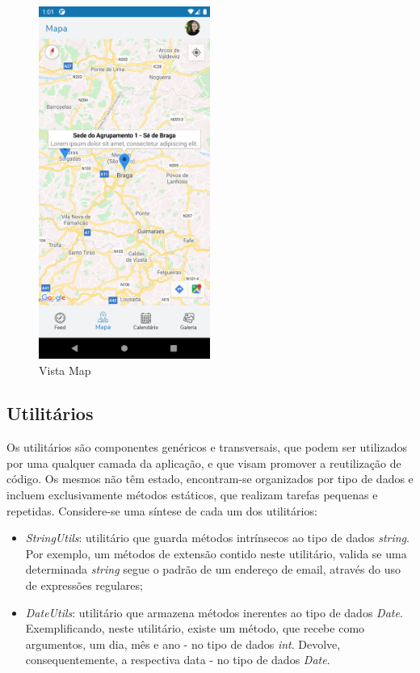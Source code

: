 \documentclass[12pt]{report}
\begin{document}
\begin{itemize}
    \bigskip
    \begin{figure}[H]
        \centering
        \includegraphics[width=0.5\textwidth]{view-map.png}
        \caption{Vista Map}
    \end{figure}

\end{itemize}

\clearpage

\subsection{Utilitários}

Os utilitários são componentes genéricos e transversais, que podem ser utilizados por uma qualquer camada da aplicação, e que visam promover a reutilização de código. Os mesmos não têm estado, encontram-se organizados por tipo de dados e incluem exclusivamente métodos estáticos, que realizam tarefas pequenas e repetidas. Considere-se uma síntese de cada um dos utilitários:

\begin{itemize}
    \item \emph{StringUtils}: utilitário que guarda métodos intrínsecos ao tipo de dados \textit{string}. Por exemplo, um métodos de extensão contido neste utilitário, valida se uma determinada \textit{string} segue o padrão de um endereço de email, através do uso de expressões regulares; 
    
    \item \emph{DateUtils}: utilitário que armazena métodos inerentes ao tipo de dados \textit{Date}. Exemplificando, neste utilitário, existe um método, que recebe como argumentos, um dia, mês e ano - no tipo de dados \textit{int}. Devolve, consequentemente, a respectiva data - no tipo de dados \textit{Date}.
\end{itemize}
\end{document}
